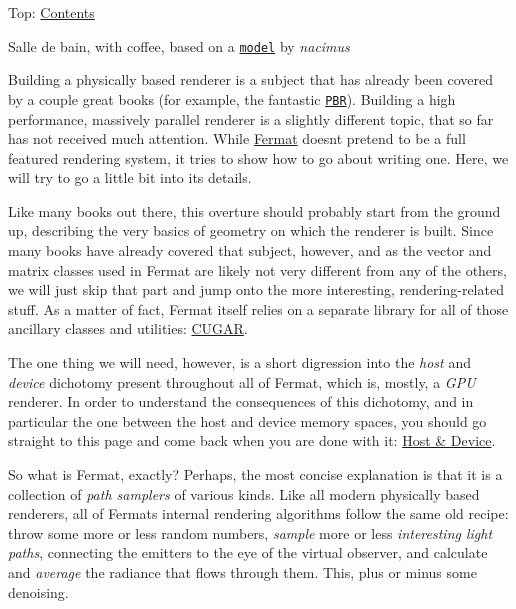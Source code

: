 Top\+: \hyperlink{_overture_contents_page}{Contents}

 \begin{DoxyParagraph}{}

\footnotesize \textquotesingle{}Salle de bain, with coffee\textquotesingle{}, based on a \href{http://www.blendswap.com/blends/view/73937}{\tt model} by {\itshape nacimus}
\normalsize  ~\newline

\end{DoxyParagraph}
\begin{DoxyParagraph}{}
Building a physically based renderer is a subject that has already been covered by a couple great books (for example, the fantastic \href{http://www.pbr-book.org}{\tt P\+BR}). Building a high performance, massively parallel renderer is a slightly different topic, that so far has not received much attention. While \hyperlink{group___fermat}{Fermat} doesn\textquotesingle{}t pretend to be a full featured rendering system, it tries to show how to go about writing one. Here, we will try to go a little bit into its details. 
\end{DoxyParagraph}
\begin{DoxyParagraph}{}
Like many books out there, this overture should probably start from the ground up, describing the very basics of geometry on which the renderer is built. Since many books have already covered that subject, however, and as the vector and matrix classes used in Fermat are likely not very different from any of the others, we will just skip that part and jump onto the more interesting, rendering-\/related stuff. As a matter of fact, Fermat itself relies on a separate library for all of those ancillary classes and utilities\+: \hyperlink{cugar_page}{C\+U\+G\+AR}. 
\end{DoxyParagraph}
\begin{DoxyParagraph}{}
The one thing we will need, however, is a short digression into the {\itshape host} and {\itshape device} dichotomy present throughout all of Fermat, which is, mostly, a {\itshape G\+PU} renderer. In order to understand the consequences of this dichotomy, and in particular the one between the host and device memory spaces, you should go straight to this page and come back when you are done with it\+: \hyperlink{_fermat_host_device_page}{Host \& Device}.
\end{DoxyParagraph}
\begin{DoxyParagraph}{}
So what is Fermat, exactly? Perhaps, the most concise explanation is that it is a collection of {\itshape path samplers} of various kinds. Like all modern physically based renderers, all of Fermat\textquotesingle{}s internal rendering algorithms follow the same old recipe\+: throw some more or less random numbers, {\itshape sample} more or less {\itshape interesting light paths}, connecting the emitters to the eye of the virtual observer, and calculate and {\itshape average} the radiance that flows through them. This, plus or minus some denoising. 
\end{DoxyParagraph}
